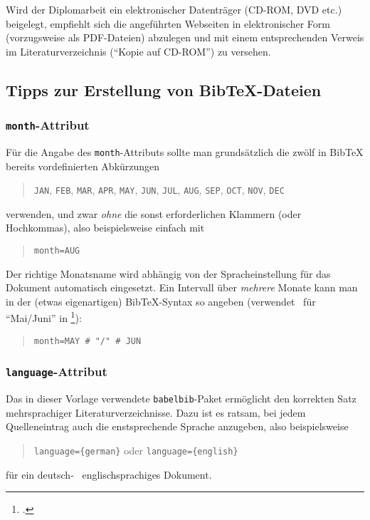 Wird der Diplomarbeit ein elektronischer Datenträger (CD-ROM, DVD
etc.) beigelegt, empfiehlt sich die angeführten Webseiten in
elektronischer Form (vorzugsweise als PDF-Da\-tei\-en) abzulegen
und mit einem entsprechenden Verweis im Literaturverzeichnis
("`Kopie auf CD-ROM"') zu versehen.

\subsection{Tipps zur Erstellung von BibTeX-Dateien}
\label{sec:TippsZuBibtex}

\subsubsection{\texttt{month}-Attribut}

Für die Angabe des \texttt{month}-Attributs sollte man grundsätzlich die zwölf in BibTeX bereits vordefinierten Abkürzungen
\begin{quote}
\texttt{JAN}, \texttt{FEB}, \texttt{MAR}, \texttt{APR}, 
\texttt{MAY}, \texttt{JUN}, \texttt{JUL}, \texttt{AUG}, 
\texttt{SEP}, \texttt{OCT}, \texttt{NOV}, \texttt{DEC}
\end{quote}
verwenden, und zwar \emph{ohne} die sonst erforderlichen Klammern (oder Hochkommas), also beispielsweise einfach mit
%
\begin{quote}
\verb!month=AUG!
\end{quote}
%
Der richtige Monatsname wird abhängig von der Spracheinstellung für das Dokument automatisch eingesetzt.
Ein Intervall über \emph{mehrere} Monate kann man in der (etwas eigenartigen) BibTeX-Syntax so angeben (verwendet \zB\ für "`Mai/Juni"' in \footcite{Guttman01}):
\begin{quote}
\verb!month=MAY # "/" # JUN!
\end{quote}


\subsubsection{\texttt{language}-Attribut}

Das in dieser Vorlage verwendete \verb!babelbib!-Paket ermöglicht den korrekten Satz mehrsprachiger Literaturverzeichnisse. Dazu ist es ratsam, bei jedem Quelleneintrag auch die enstsprechende Sprache anzugeben, also beispielsweise
\begin{quote}
\verb!language={german}! \quad oder \quad \verb!language={english}!
\end{quote}
für ein deutsch- \bzw\ englischsprachiges Dokument.

